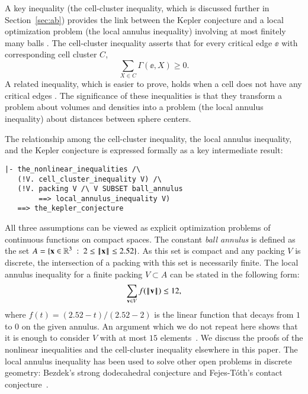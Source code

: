 A key inequality (the cell-cluster inequality, which is discussed
further in Section~\ref{sec:ab}) provides the link between the Kepler
conjecture and a local optimization problem (the local annulus
inequality) involving at most finitely many balls \cite[6.93]{DSP}.
The cell-cluster inequality asserts that for every critical edge $\ee$
with corresponding cell cluster $C$,
\[
\sum_{X\in C} \Gamma(\ee,X)\ge 0.
\]
A related inequality, which  is easier to prove, holds when a cell does
not have any critical edges \cite[6.92]{DSP}.  The significance of
these inequalities is that they transform a problem about volumes and
densities into a problem (the local annulus inequality) about
distances between sphere centers.

The relationship among the cell-cluster inequality, the local annulus
inequality, and the Kepler conjecture is expressed formally as a
key intermediate result:
% 

\begin{verbatim}
|- the_nonlinear_inequalities /\ 
   (!V. cell_cluster_inequality V) /\
   (!V. packing V /\ V SUBSET ball_annulus 
        ==> local_annulus_inequality V) 
   ==> the_kepler_conjecture
\end{verbatim}

All three assumptions can be viewed as explicit optimization problems
of continuous functions on compact spaces.
The constant {\it ball annulus} is defined as the set
$A=\{{\bf x}\in\mathbb{R}^3 \ :\  2\le {\hbox{\ensuremath{\hspace{0.1em}|\hspace{-0.1em}|\hspace{0.1em}}}{\bf x}\hbox{\ensuremath{\hspace{0.1em}|\hspace{-0.1em}|\hspace{0.1em}}}} \le 2.52\}$.  As this set is
compact and any packing $V$ is discrete, the intersection of a packing
with this set is necessarily finite.   The local annulus inequality for a finite
packing $V\subset A$ can be stated in the following form:
\begin{equation}\label{eqn:la}
\sum_{{\mathbf v}\in V} f({\hbox{\ensuremath{\hspace{0.1em}|\hspace{-0.1em}|\hspace{0.1em}}}{\mathbf v}\hbox{\ensuremath{\hspace{0.1em}|\hspace{-0.1em}|\hspace{0.1em}}}})  \le 12,
\end{equation}
where $f(t) = (2.52-t)/(2.52-2)$ is the linear function that decays
from $1$ to $0$ on the given annulus.  An argument which we do not
repeat here shows that it is enough to consider $V$ with at most $15$
elements~\cite[Lemma~6.110]{DSP}.  We discuss the proofs of the nonlinear
inequalities and the cell-cluster inequality elsewhere in this paper.
The local annulus inequality has been used to solve other open
problems in discrete geometry: Bezdek's strong dodecahedral conjecture
and Fejes-T\'oth's contact conjecture~\cite{hales2011strong}.

